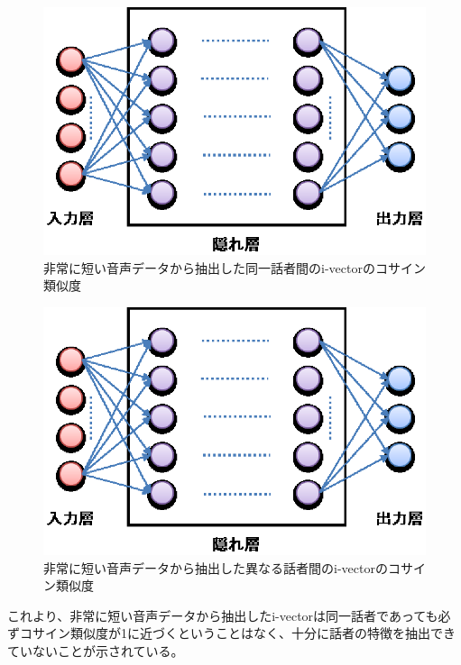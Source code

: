 \begin{figure}[htb]
  \begin{center}
    \includegraphics{../../image/image_dnn.eps}
  \end{center}
  \caption{非常に短い音声データから抽出した同一話者間のi-vectorのコサイン類似度}
  \label{fig:iv_same_short}
\end{figure}

\begin{figure}[htb]
  \begin{center}
    \includegraphics{../../image/image_dnn.eps}
  \end{center}
  \caption{非常に短い音声データから抽出した異なる話者間のi-vectorのコサイン類似度}
  \label{fig:iv_other_short}
\end{figure}

これより、非常に短い音声データから抽出したi-vectorは同一話者であっても必ずコサイン類似度が1に近づくということはなく、十分に話者の特徴を抽出できていないことが示されている。
